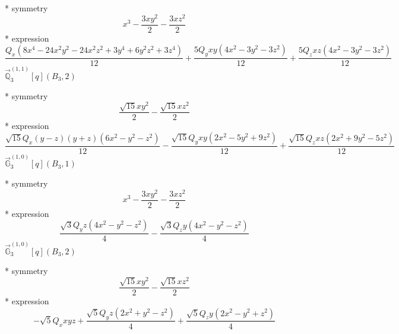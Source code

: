 \documentclass[fleqn,8pt]{jsarticle}
\begin{document}
\noindent\quad ** symmetry
\begin{dmath*}
x^{3} - \frac{3 x y^{2}}{2} - \frac{3 x z^{2}}{2}
\end{dmath*}
\noindent\quad ** expression
\begin{dmath*}
\frac{Q_{x} \left(8 x^{4} - 24 x^{2} y^{2} - 24 x^{2} z^{2} + 3 y^{4} + 6 y^{2} z^{2} + 3 z^{4}\right)}{12} + \frac{5 Q_{y} x y \left(4 x^{2} - 3 y^{2} - 3 z^{2}\right)}{12} + \frac{5 Q_{z} x z \left(4 x^{2} - 3 y^{2} - 3 z^{2}\right)}{12}
\end{dmath*}
\noindent\quad $\vec{\mathbb{Q}}_{3}^{(1,1)}[q](B_{3},2)$

\noindent\quad ** symmetry
\begin{dmath*}
\frac{\sqrt{15} x y^{2}}{2} - \frac{\sqrt{15} x z^{2}}{2}
\end{dmath*}
\noindent\quad ** expression
\begin{dmath*}
\frac{\sqrt{15} Q_{x} \left(y - z\right) \left(y + z\right) \left(6 x^{2} - y^{2} - z^{2}\right)}{12} - \frac{\sqrt{15} Q_{y} x y \left(2 x^{2} - 5 y^{2} + 9 z^{2}\right)}{12} + \frac{\sqrt{15} Q_{z} x z \left(2 x^{2} + 9 y^{2} - 5 z^{2}\right)}{12}
\end{dmath*}
\noindent\quad $\vec{\mathbb{G}}_{3}^{(1,0)}[q](B_{3},1)$

\noindent\quad ** symmetry
\begin{dmath*}
x^{3} - \frac{3 x y^{2}}{2} - \frac{3 x z^{2}}{2}
\end{dmath*}
\noindent\quad ** expression
\begin{dmath*}
\frac{\sqrt{3} Q_{y} z \left(4 x^{2} - y^{2} - z^{2}\right)}{4} - \frac{\sqrt{3} Q_{z} y \left(4 x^{2} - y^{2} - z^{2}\right)}{4}
\end{dmath*}
\noindent\quad $\vec{\mathbb{G}}_{3}^{(1,0)}[q](B_{3},2)$

\noindent\quad ** symmetry
\begin{dmath*}
\frac{\sqrt{15} x y^{2}}{2} - \frac{\sqrt{15} x z^{2}}{2}
\end{dmath*}
\noindent\quad ** expression
\begin{dmath*}
- \sqrt{5} Q_{x} x y z + \frac{\sqrt{5} Q_{y} z \left(2 x^{2} + y^{2} - z^{2}\right)}{4} + \frac{\sqrt{5} Q_{z} y \left(2 x^{2} - y^{2} + z^{2}\right)}{4}
\end{dmath*}
\end{document}
